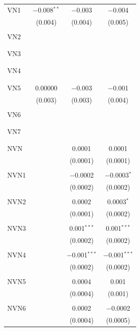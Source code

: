 \begin{table}[!htbp]
\begin{tabular}{@{\extracolsep{5pt}}lccc}
 VN1 & $-$0.008$^{**}$ & $-$0.003 & $-$0.004 \\ 
  & (0.004) & (0.004) & (0.005) \\ 
  & & & \\ 
 VN2 &  &  &  \\ 
  &  &  &  \\ 
  & & & \\ 
 VN3 &  &  &  \\ 
  &  &  &  \\ 
  & & & \\ 
 VN4 &  &  &  \\ 
  &  &  &  \\ 
  & & & \\ 
 VN5 & 0.00000 & $-$0.003 & $-$0.001 \\ 
  & (0.003) & (0.003) & (0.004) \\ 
  & & & \\ 
 VN6 &  &  &  \\ 
  &  &  &  \\ 
  & & & \\ 
 VN7 &  &  &  \\ 
  &  &  &  \\ 
  & & & \\ 
 NVN &  & 0.0001 & 0.0001 \\ 
  &  & (0.0001) & (0.0001) \\ 
  & & & \\ 
 NVN1 &  & $-$0.0002 & $-$0.0003$^{*}$ \\ 
  &  & (0.0002) & (0.0002) \\ 
  & & & \\ 
 NVN2 &  & 0.0002 & 0.0003$^{*}$ \\ 
  &  & (0.0001) & (0.0002) \\ 
  & & & \\ 
 NVN3 &  & 0.001$^{***}$ & 0.001$^{***}$ \\ 
  &  & (0.0002) & (0.0002) \\ 
  & & & \\ 
 NVN4 &  & $-$0.001$^{***}$ & $-$0.001$^{***}$ \\ 
  &  & (0.0002) & (0.0002) \\ 
  & & & \\ 
 NVN5 &  & 0.0004 & 0.001 \\ 
  &  & (0.0004) & (0.001) \\ 
  & & & \\ 
 NVN6 &  & 0.0002 & $-$0.0002 \\ 
  &  & (0.0004) & (0.0005) \\ 

\end{tabular}
\end{table}
